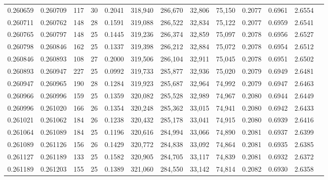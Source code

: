 \begin{tabular}{rrrrrrrrrrrrr}
0.260659 & 0.260709 &   117 &  30 &                                     0.2041 & 318,940 & 286,670 &  32,806 &  75,150 & 0.2077 & 0.6961 & 2.6554 \\
0.260711 & 0.260762 &   148 &  28 &                                     0.1591 & 319,088 & 286,522 &  32,834 &  75,122 & 0.2077 & 0.6959 & 2.6541 \\
0.260765 & 0.260797 &   148 &  25 &                                     0.1445 & 319,236 & 286,374 &  32,859 &  75,097 & 0.2078 & 0.6956 & 2.6527 \\
0.260798 & 0.260846 &   162 &  25 &                                     0.1337 & 319,398 & 286,212 &  32,884 &  75,072 & 0.2078 & 0.6954 & 2.6512 \\
0.260846 & 0.260893 &   108 &  27 &                                     0.2000 & 319,506 & 286,104 &  32,911 &  75,045 & 0.2078 & 0.6951 & 2.6502 \\
0.260893 & 0.260947 &   227 &  25 &                                     0.0992 & 319,733 & 285,877 &  32,936 &  75,020 & 0.2079 & 0.6949 & 2.6481 \\
0.260947 & 0.260965 &   190 &  28 &                                     0.1284 & 319,923 & 285,687 &  32,964 &  74,992 & 0.2079 & 0.6947 & 2.6463 \\
0.260966 & 0.260996 &   159 &  25 &                                     0.1359 & 320,082 & 285,528 &  32,989 &  74,967 & 0.2080 & 0.6944 & 2.6449 \\
0.260996 & 0.261020 &   166 &  26 &                                     0.1354 & 320,248 & 285,362 &  33,015 &  74,941 & 0.2080 & 0.6942 & 2.6433 \\
0.261021 & 0.261062 &   184 &  26 &                                     0.1238 & 320,432 & 285,178 &  33,041 &  74,915 & 0.2080 & 0.6939 & 2.6416 \\
0.261064 & 0.261089 &   184 &  25 &                                     0.1196 & 320,616 & 284,994 &  33,066 &  74,890 & 0.2081 & 0.6937 & 2.6399 \\
0.261089 & 0.261126 &   156 &  26 &                                     0.1429 & 320,772 & 284,838 &  33,092 &  74,864 & 0.2081 & 0.6935 & 2.6385 \\
0.261127 & 0.261189 &   133 &  25 &                                     0.1582 & 320,905 & 284,705 &  33,117 &  74,839 & 0.2081 & 0.6932 & 2.6372 \\
0.261189 & 0.261203 &   155 &  25 &                                     0.1389 & 321,060 & 284,550 &  33,142 &  74,814 & 0.2082 & 0.6930 & 2.6358 \\

\end{tabular}
